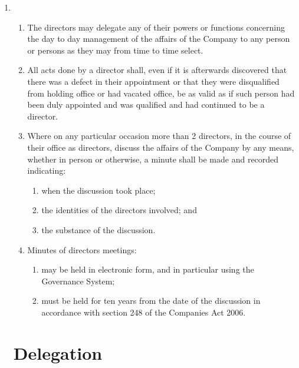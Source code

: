 \begin{enumerate}
\item
    \begin{enumerate}
    \item
        The directors may delegate any of their powers or functions concerning the day
        to day management of the affairs of the Company to any person or persons as they may
        from time to time select.
    \item
        All acts done by a director shall, even if it is afterwards discovered that there was
        a defect in their appointment or that they were disqualified from holding office or had
        vacated office, be as valid as if such person had been duly appointed and was qualified
        and had continued to be a director.
    \item
        Where on any particular occasion more than 2 directors, in the course of their
        office as directors, discuss the affairs of the Company by any means, whether in person
        or otherwise, a minute shall be made and recorded indicating:
            \begin{enumerate}
                \item
                    when the discussion took place;
                \item
                    the identities of the directors involved; and
                \item
                    the substance of the discussion.
            \end{enumerate}
    \item
        Minutes of directors meetings:
            \begin{enumerate}
                \item
                    may be held in electronic form, and in particular using the Governance System;
                \item
                    must be held for ten years from the date of the discussion in accordance with section
                    248 of the Companies Act 2006.
            \end{enumerate}
    \end{enumerate}

\section{Delegation}


\end{enumerate}
